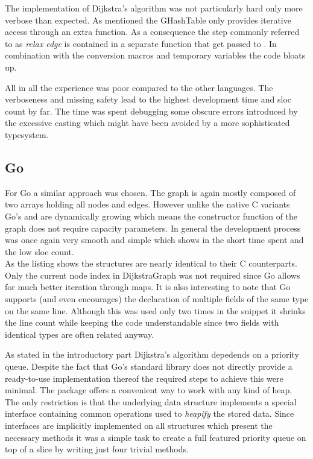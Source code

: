 The implementation of Dijkstra's algorithm was not particularly hard only more verbose than expected. As mentioned the GHashTable only provides iterative access through an extra function. As a consequence the step commonly referred to as \textit{relax edge} is contained in a separate function that get passed to . In combination with the conversion macros and temporary variables the code bloats up.

All in all the experience was poor compared to the other languages. The verboseness and missing safety lead to the highest development time and \gls{sloc} count by far. The time was spent debugging some obscure errors introduced by the excessive casting which might have been avoided by a more sophisticated typesystem.

\subsection{Go}
\label{subsec:Implementation::Graph_Representation::Go}

For Go a similar approach was chosen. The graph is again mostly composed of two arrays holding all nodes and edges. However unlike the native C variants Go's  and  are dynamically growing which means the constructor function of the graph does not require capacity parameters. In general the development process was once again very smooth and simple which shows in the short time spent and the low \gls{sloc} count.
\\


As the listing shows the structures are nearly identical to their C counterparts. Only the current node index in DijkstraGraph was not required since Go allows for much better iteration through maps. It is also interesting to note that Go supports (and even encourages) the declaration of multiple fields of the same type on the same line. Although this was used only two times in the snippet it shrinks the line count while keeping the code understandable since two fields with identical types are often related anyway.

As stated in the introductory part Dijkstra's algorithm depedends on a priority queue. Despite the fact that Go's standard library does not directly provide a ready-to-use implementation thereof the required steps to achieve this were minimal. The package  offers a convenient way to work with any kind of heap. The only restriction is that the underlying data structure implements a special interface containing common operations used to \textit{heapify} the stored data. Since interfaces are implicitly implemented on all structures which present the necessary methods it was a simple task to create a full featured priority queue on top of a slice by writing just four trivial methods.
\\


